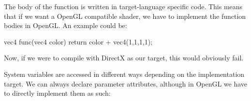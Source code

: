 \documentclass{article}
\begin{document}
\begin{table}[float]
\caption{Input Primitive}
\label{table:inputprimitive}
\end{table}

\begin{table}[float]
\caption{Output Primitive}
\label{table:outputprimitive}
\end{table}

The body of the function is written in target-language specific code. This means that if we want a OpenGL compatible shader, we have to implement the function bodies in OpenGL. An example could be:

\begin{CodeBox}
vec4
func(vec4 color)
{
	return color + vec4(1,1,1,1);
}
\end{CodeBox}

Now, if we were to compile with DirectX as our target, this would obviously fail. 

System variables are accessed in different ways depending on the implementation target. We can always declare parameter attributes, although in OpenGL we have to directly implement them as such:
\end{document}
